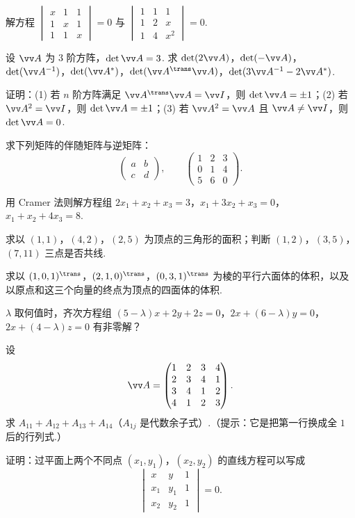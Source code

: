 {\begin{exA}
			\item\label{ex:det:A7} 解方程 $\begin{vmatrix}x&1&1\\1&x&1\\1&1&x\end{vmatrix}=0$ 与 $\begin{vmatrix}1&1&1\\1&2&x\\1&4&x^2\end{vmatrix}=0$.
			\item\label{ex:det:A8} 设 $\vv A$ 为 $3$ 阶方阵，$\det\vv A=3$. 求 $\det(2\vv A)$，$\det(-\vv A)$，$\det(\vv A^{-1})$，$\det(\vv A^*)$，$\det(\vv A^\trans\vv A)$，$\det(3\vv A^{-1}-2\vv A^*)$.
			\item\label{ex:det:A9} 证明：(1) 若 $n$ 阶方阵满足 $\vv A^\trans\vv A=\vv I$，则 $\det\vv A=\pm1$；(2) 若 $\vv A^2=\vv I$，则 $\det\vv A=\pm1$；(3) 若 $\vv A^2=\vv A$ 且 $\vv A\ne\vv I$，则 $\det\vv A=0$.
			\item\label{ex:det:A10} 求下列矩阵的伴随矩阵与逆矩阵：\[\begin{pmatrix}a&b\\c&d\end{pmatrix},\qquad\begin{pmatrix}1&2&3\\0&1&4\\5&6&0\end{pmatrix}.\]
			\item\label{ex:det:A11} 用 Cramer 法则解方程组 $2x_1+x_2+x_3=3$，$x_1+3x_2+x_3=0$，$x_1+x_2+4x_3=8$.
			\item\label{ex:det:A12} 求以 $(1,1)$，$(4,2)$，$(2,5)$ 为顶点的三角形的面积；判断 $(1,2)$，$(3,5)$，$(7,11)$ 三点是否共线.
			\item\label{ex:det:A13} 求以 $(1,0,1)^\trans$，$(2,1,0)^\trans$，$(0,3,1)^\trans$ 为棱的平行六面体的体积，以及以原点和这三个向量的终点为顶点的四面体的体积.
			\item\label{ex:det:A14} $\lambda$ 取何值时，齐次方程组 $(5-\lambda)x+2y+2z=0$，$2x+(6-\lambda)y=0$，$2x+(4-\lambda)z=0$ 有非零解？
			\item\label{ex:det:A15} 设 \[\vv A=\begin{pmatrix}1&2&3&4\\2&3&4&1\\3&4&1&2\\4&1&2&3\end{pmatrix}.\] 求 $A_{11}+A_{12}+A_{13}+A_{14}$（$A_{1j}$ 是代数余子式）.（提示：它是把第一行换成全 $1$ 后的行列式.）
			\item\label{ex:det:A16} 证明：过平面上两个不同点 $(x_1,y_1)$，$(x_2,y_2)$ 的直线方程可以写成 \[\begin{vmatrix}x&y&1\\x_1&y_1&1\\x_2&y_2&1\end{vmatrix}=0.\]

\end{exA}}
